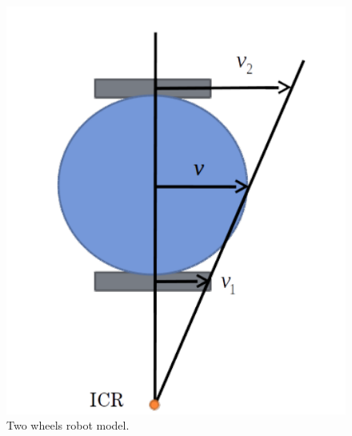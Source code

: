 \begin{figure}[!htb]
\begin{center}
\includegraphics[scale=0.290]{img/kinematics/icr.jpeg}
\end{center}
\caption{Two wheels robot model.}
\label{icr}
\end{figure}

